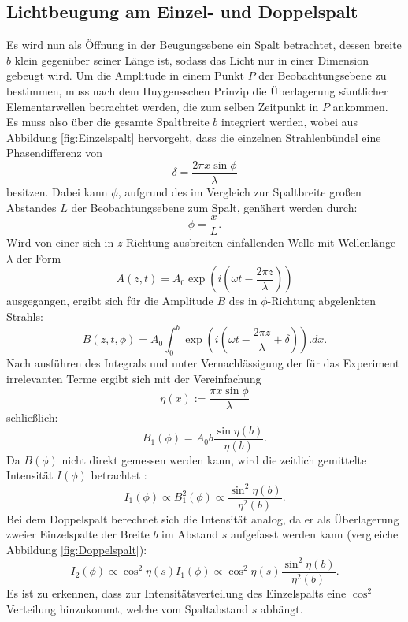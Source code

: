 \subsection{Lichtbeugung am Einzel- und Doppelspalt}

Es wird nun als Öffnung in der Beugungsebene ein Spalt betrachtet, dessen breite $b$ klein gegenüber seiner Länge ist, sodass das Licht nur in einer Dimension gebeugt wird. 
Um die Amplitude in einem Punkt $P$ der Beobachtungsebene zu bestimmen, muss nach dem Huygensschen Prinzip die Überlagerung sämtlicher Elementarwellen betrachtet werden, die zum selben Zeitpunkt in $P$ ankommen. Es muss also über die gesamte Spaltbreite $b$ integriert werden, wobei aus Abbildung \ref{fig:Einzelspalt} hervorgeht, dass die einzelnen Strahlenbündel eine Phasendifferenz von 
\[
\delta = \frac{2\pi x \sin \phi}{\lambda}
\]
besitzen. Dabei kann $\phi$, aufgrund des im Vergleich zur Spaltbreite großen Abstandes $L$ der Beobachtungsebene zum Spalt, genähert werden durch:
\begin{equation}
\phi = \frac{x}{L} \text{.}\label{eq:phi}
\end{equation} 
Wird von einer sich in $z$-Richtung ausbreiten einfallenden Welle mit Wellenlänge $\lambda$ der Form
\[
A(z,t) = A_0\exp \left(i\left(\omega t-\frac{2\pi z}{\lambda}\right)\right)
\]
ausgegangen, ergibt sich für die Amplitude $B$ des in $\phi$-Richtung abgelenkten Strahls:
\[
B(z,t,\phi) = A_0 \int_0^b\exp\left(i\left(\omega t-\frac{2\pi z}{\lambda}+\delta\right)\right).dx\text{.}
\]
Nach ausführen des Integrals und unter Vernachlässigung der für das Experiment irrelevanten Terme ergibt sich mit der Vereinfachung
\begin{equation}
\eta(x) := \frac{\pi x \sin \phi}{\lambda} \label{eq:eta}
\end{equation}
schließlich:
\[
B_1(\phi) = A_0b\frac{\sin \eta(b)}{\eta(b)}\text{.}
\]
Da $B(\phi)$ nicht direkt gemessen werden kann, wird die zeitlich gemittelte Intensität $I(\phi)$ betrachtet :
\begin{equation}
I_1(\phi)\propto B^2_1(\phi) \propto \frac{\sin^2 \eta(b)}{\eta^2(b)}\text{.} \label{eq:I1}
\end{equation}
Bei dem Doppelspalt berechnet sich die Intensität analog, da er als Überlagerung zweier Einzelspalte der Breite $b$ im Abstand $s$ aufgefasst werden kann (vergleiche Abbildung \ref{fig:Doppelspalt}):
\begin{equation}
I_2(\phi) \propto \cos^2\eta(s) I_1(\phi) \propto \cos^2\eta(s)\frac{\sin^2 \eta(b)}{\eta^2(b)}\text{.}\label{eq:I2}
\end{equation}
Es ist zu erkennen, dass zur Intensitätsverteilung des Einzelspalts eine $\cos^2$ Verteilung hinzukommt, welche vom Spaltabstand $s$ abhängt.

